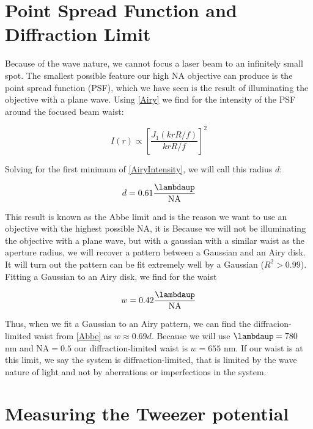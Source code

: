 \section{Point Spread Function and Diffraction Limit}

Because of the wave nature, we cannot focus a laser beam to an infinitely small spot. The smallest possible feature our high NA objective can produce is the point spread function (PSF), which we have seen is the result of illuminating the objective with a plane wave. Using \cref{Airy} we find for the intensity of the PSF around the focused beam waist:

\begin{equation}\label{AiryIntensity}
    I(r) \propto \left[\frac{J_1(krR/f)}{krR/f} \right]^2
\end{equation}

Solving for the first minimum of \cref{AiryIntensity}, we will call this radius $d$:

\begin{equation}\label{Abbe}
    d = 0.61 \frac{\lambdaup}{\text{NA}}
\end{equation}

This result is known as the Abbe limit \cite{Hecht2002} and is the reason we want to use an objective with the highest possible NA, it is Because we will not be illuminating the objective with a plane wave, but with a gaussian with a similar waist as the aperture radius, we will recover a pattern between a Gaussian and an Airy disk. It will turn out the pattern can be fit extremely well by a Gaussian ($R^2 > 0.99$). Fitting a Gaussian to an Airy disk, we find for the waist

\begin{equation}\label{GaussianAiryFit}
    w = 0.42 \frac{\lambdaup}{\text{NA}}
\end{equation}
 
Thus, when we fit a Gaussian to an Airy pattern, we can find the diffracion-limited waist from \cref{Abbe} as $w \approx 0.69 d$. Because we will use $\lambdaup = 780$ nm and $\text{NA}=0.5$ our diffraction-limited waist is $w = 655$ nm. If our waist is at this limit, we say the system is diffraction-limited, that is limited by the wave nature of light and not by aberrations or imperfections in the system. 


\section{Measuring the Tweezer potential}

